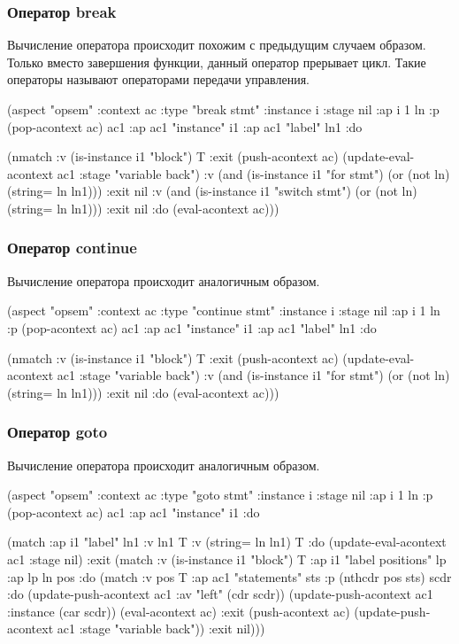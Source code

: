 \documentclass[12pt,twoside,russian]{article}
\newcommand{\textGoKeyword}[1]{{\color{goPurple}\textbf{#1}}}
\newcommand{\GoKeyword}[1]{\goinline{\textGoKeyword{#1}}}
\begin{document}
\subsubsection{Оператор break}
Вычисление оператора \GoKeyword{break} происходит похожим с предыдущим случаем образом. Только вместо завершения функции, данный оператор прерывает цикл. Такие операторы называют операторами передачи управления.

\begin{ABMLCode}
(aspect "opsem" :context ac :type "break stmt" :instance i 
  :stage nil :ap i 1 ln :p (pop-acontext ac) ac1 :ap ac1 "instance" i1 
  :ap ac1 "label" ln1 :do
  
  (nmatch 
  :v (is-instance i1 "block") T 
  :exit 
  (push-acontext ac) (update-eval-acontext ac1 :stage "variable back")
  :v (and (is-instance i1 "for stmt") (or (not ln) (string= ln ln1))) 
  :exit nil 
  :v (and (is-instance i1 "switch stmt") (or (not ln) (string= ln ln1))) 
  :exit nil 
  :do (eval-acontext ac)))
\end{ABMLCode}

\subsubsection{Оператор continue}
Вычисление оператора \GoKeyword{continue} происходит аналогичным образом.

\begin{ABMLCode}
(aspect "opsem" :context ac :type "continue stmt" :instance i 
  :stage nil :ap i 1 ln :p (pop-acontext ac) ac1 :ap ac1 "instance" i1 
  :ap ac1 "label" ln1 :do 
  
  (nmatch 
  :v (is-instance i1 "block") T 
  :exit 
  (push-acontext ac) (update-eval-acontext ac1 :stage "variable back")
  :v (and (is-instance i1 "for stmt") (or (not ln) (string= ln ln1))) 
  :exit nil 
  :do (eval-acontext ac)))
\end{ABMLCode}

\subsubsection{Оператор goto}
Вычисление оператора \GoKeyword{goto} происходит аналогичным образом.

\begin{ABMLCode}
(aspect "opsem" :context ac :type "goto stmt" :instance i 
  :stage nil :ap i 1 ln :p (pop-acontext ac) ac1 
  :ap ac1 "instance" i1 :do 
  
  (match :ap i1 "label" ln1 :v ln1 T :v (string= ln ln1) T 
  :do (update-eval-acontext ac1 :stage nil)
  :exit (match :v (is-instance i1 "block") T 
    :ap i1 "label positions" lp :ap lp ln pos 
    :do (match :v pos T :ap ac1 "statements" sts 
      :p (nthcdr pos sts) scdr :do 
      (update-push-acontext ac1 :av "left" (cdr scdr)) 
      (update-push-acontext ac1 :instance (car scdr)) 
      (eval-acontext ac)
      :exit 
      (push-acontext ac) (update-push-acontext ac1 :stage "variable back"))
    :exit nil)))
\end{ABMLCode}
\end{document}
